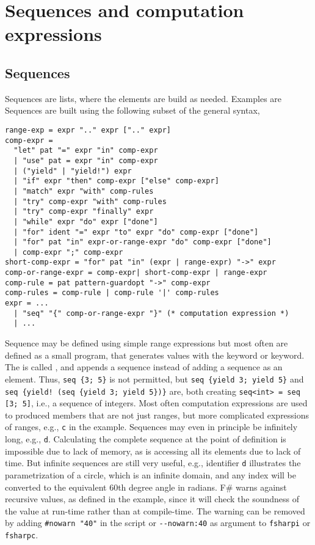 \chapter{Sequences and computation expressions}
\label{chap:sequences}
\section{Sequences}
\label{sec:sequences}
Sequences are lists, where the elements are build as needed. Examples are
%
%
Sequences are built using the following subset of the general syntax,
\begin{lstlisting}[language=ebnf]
range-exp = expr ".." expr [".." expr]
comp-expr =
  "let" pat "=" expr "in" comp-expr
  | "use" pat = expr "in" comp-expr
  | ("yield" | "yield!") expr
  | "if" expr "then" comp-expr ["else" comp-expr]
  | "match" expr "with" comp-rules
  | "try" comp-expr "with" comp-rules
  | "try" comp-expr "finally" expr
  | "while" expr "do" expr ["done"]
  | "for" ident "=" expr "to" expr "do" comp-expr ["done"]
  | "for" pat "in" expr-or-range-expr "do" comp-expr ["done"]
  | comp-expr ";" comp-expr
short-comp-expr = "for" pat "in" (expr | range-expr) "->" expr
comp-or-range-expr = comp-expr| short-comp-expr | range-expr
comp-rule = pat pattern-guardopt "->" comp-expr
comp-rules = comp-rule | comp-rule '|' comp-rules
expr = ... 
  | "seq" "{" comp-or-range-expr "}" (* computation expression *)
  | ...
\end{lstlisting}
%
Sequence may be defined using simple range expressions but most often are defined as a small program, that generates values with the  keyword or  keyword. The  is called , and appends a sequence instead of adding a sequence as an element. Thus, \lstinline!seq {3; 5}! is not permitted, but \lstinline!seq {yield 3; yield 5}! and \lstinline|seq {yield! (seq {yield 3; yield 5})}| are, both creating \lstinline!seq<int> = seq [3; 5]!, i.e., a sequence of integers. Most often computation expressions are used to produced members that are not just ranges, but more complicated expressions of ranges, e.g., \lstinline!c! in the example. Sequences may even in principle be infinitely long, e.g., \lstinline!d!. Calculating the complete sequence at the point of definition is impossible due to lack of memory, as is accessing all its elements due to lack of time. But infinite sequences are still very useful, e.g., identifier \lstinline!d! illustrates the parametrization of a circle, which is an infinite domain, and any index will be converted to the equivalent 60th degree angle in radians. F\# warns against recursive values, as defined in the example, since it will check the soundness of the value at run-time rather than at compile-time. The warning can be removed by adding \lstinline!#nowarn "40"! in the script or \lstinline!--nowarn:40! as argument to \lstinline[language=console]!fsharpi! or \lstinline[language=console]!fsharpc!.

